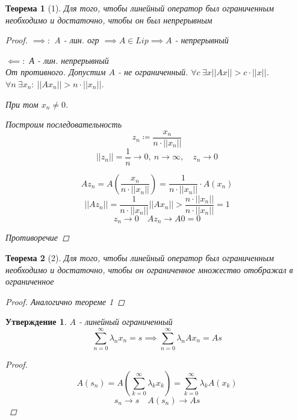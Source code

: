 \documentclass[a4paper]{article}
\newtheorem*{theorem}{Теорема}
\newtheorem*{statement}{Утверждение}
\theoremstyle{definition}
\theoremstyle{remark}
\begin{document}
\begin{tcolorbox}
\begin{theorem}[1]
    Для того, чтобы линейный оператор был ограниченным необходимо и достаточно,
    чтобы он был непрерывным

    \begin{proof}
        $ \implies: $ A - лин. огр $ \implies A \in Lip \implies A $ - непрерывный 

        $ \impliedby: $ А - лин. непрерывный\\
        От противного. Допустим $ A $ - не ограниченный. $ \forall c \ \exists x
        ||Ax|| > c \cdot ||x||$.\\
        $ \forall n \ \exists x_n : \ ||Ax_n|| > n \cdot ||x_n|| $.

        При том $ x_n \neq 0 $.

        Построим последовательность
        \[
            z_n \coloneq \frac{x_n}{n \cdot ||x_n||}
        \]
        \[
            ||z_n|| = \frac{1}{n} \to 0, \ n \to \infty, \quad z_n \to 0
        \]

        \[
            Az_{n} = A\left(\frac{x_n}{n \cdot ||x_n||}\right) = 
            \frac{1}{n \cdot ||x_n||} \cdot A(x_n)
        \]
        \[
            ||Az_n|| = \frac{1}{n \cdot ||x_n||} ||Ax_n|| > 
            \frac{n \cdot ||x_n||}{n \cdot ||x_n||} = 1
        \]
        \[
            z_n \to 0 \quad Az_n \to A 0 = 0
        \]

        Противоречие
    \end{proof}
\end{theorem}
\end{tcolorbox}

\begin{tcolorbox}
    \begin{theorem}[2]
        Для того, чтобы линейный оператор был ограниченным необходимо и достаточно, чтобы
        он ограниченное множество отображал в ограниченное

        \begin{proof}
            Аналогично теореме 1
        \end{proof}
    \end{theorem}
\end{tcolorbox}
\begin{tcolorbox}
    \begin{statement}
        $ A $ - линейный ограниченный
        \[
            \sum_{n=0}^{\infty} \lambda_n x_n = s \implies \sum_{n=0}^{\infty} \lambda_n A x_n = As
        \]

        \begin{proof}
            \[
                A(s_n) = A\left(\sum_{k=0}^{\infty}  \lambda_k x_k\right)
                = \sum_{k=0}^{\infty} \lambda_k A(x_k)
            \]
            \[
                s_n \to s \quad A(s_n) \to As
            \]
        \end{proof}
    \end{statement}
\end{tcolorbox}
\end{document}
